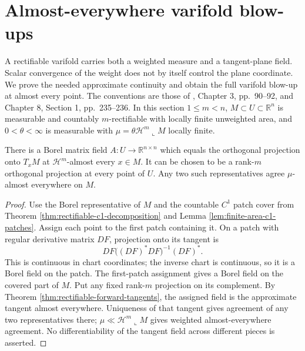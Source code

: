 \chapter{Almost-everywhere varifold blow-ups}\label{sec:rectifiable-varifold-tangents}
A rectifiable varifold carries both a weighted measure and a tangent-plane field. Scalar convergence of the weight does not by itself control the plane coordinate. We prove the needed approximate continuity and obtain the full varifold blow-up at almost every point. The conventions are those of \cite{Sim18}, Chapter 3, pp.~90--92, and Chapter 8, Section 1, pp.~235--236. In this section $1\leq m<n$, $M\subset U\subset\mathbb R^n$ is measurable and countably $m$-rectifiable with locally finite unweighted area, and $0<\theta<\infty$ is measurable with $\mu=\theta\mathcal H^m\llcorner M$ locally finite.

\begin{lemma}\label{lem:rectifiable-tangent-field-borel}
There is a Borel matrix field $A:U\to\mathbb R^{n\times n}$ which equals the orthogonal projection onto $T_xM$ at $\mathcal H^m$-almost every $x\in M$. It can be chosen to be a rank-$m$ orthogonal projection at every point of $U$. Any two such representatives agree $\mu$-almost everywhere on $M$.
\end{lemma}
\begin{proof}
Use the Borel representative of $M$ and the countable $C^1$ patch cover from Theorem \ref{thm:rectifiable-c1-decomposition} and Lemma \ref{lem:finite-area-c1-patches}. Assign each point to the first patch containing it. On a patch with regular derivative matrix $DF$, projection onto its tangent is
\[
 DF\bigl((DF)^*DF\bigr)^{-1}(DF)^*.
\]
This is continuous in chart coordinates; the inverse chart is continuous, so it is a Borel field on the patch. The first-patch assignment gives a Borel field on the covered part of $M$. Put any fixed rank-$m$ projection on its complement. By Theorem \ref{thm:rectifiable-forward-tangents}, the assigned field is the approximate tangent almost everywhere. Uniqueness of that tangent gives agreement of any two representatives there; $\mu\ll\mathcal H^m\llcorner M$ gives weighted almost-everywhere agreement. No differentiability of the tangent field across different pieces is asserted.
\end{proof}

